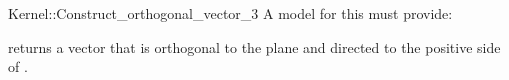 \begin{ccRefFunctionObjectConcept}{Kernel::Construct_orthogonal_vector_3}
A model for this must provide:


{returns a vector that is orthogonal to the plane  and directed
 to the positive side of .}

\ccIsModel{}

\end{ccRefFunctionObjectConcept}
